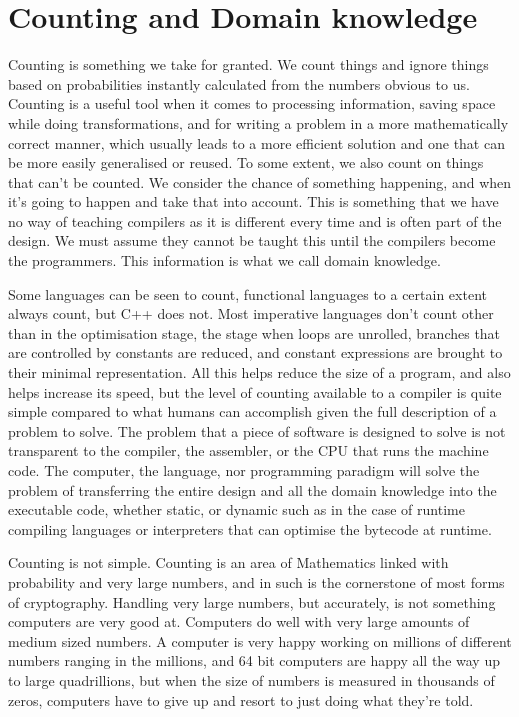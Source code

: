 \chapter{Counting and Domain knowledge}

Counting is something we take for granted. We count things and ignore things
based on probabilities instantly calculated from the numbers obvious to us.
Counting is a useful tool when it comes to processing information, saving space
while doing transformations, and for writing a problem in a more mathematically
correct manner, which usually leads to a more efficient solution and one that
can be more easily generalised or reused. To some extent, we also count on
things that can't be counted. We consider the chance of something happening,
and when it's going to happen and take that into account. This is something
that we have no way of teaching compilers as it is different every time and is
often part of the design. We must assume they cannot be taught this until the
compilers become the programmers. This information is what we call domain
knowledge.

Some languages can be seen to count, functional languages to a certain extent
always count, but C++ does not. Most imperative languages don't count other
than in the optimisation stage, the stage when loops are unrolled, branches
that are controlled by constants are reduced, and constant expressions are
brought to their minimal representation. All this helps reduce the size of a
program, and also helps increase its speed, but the level of counting available
to a compiler is quite simple compared to what humans can accomplish given the
full description of a problem to solve. The problem that a piece of software is
designed to solve is not transparent to the compiler, the assembler, or the CPU
that runs the machine code. The computer, the language, nor programming
paradigm will solve the problem of transferring the entire design and all the
domain knowledge into the executable code, whether static, or dynamic such as
in the case of runtime compiling languages or interpreters that can optimise
the bytecode at runtime.

Counting is not simple. Counting is an area of Mathematics linked with
probability and very large numbers, and in such is the cornerstone of most
forms of cryptography.  Handling very large numbers, but accurately, is not
something computers are very good at. Computers do well with very large amounts
of medium sized numbers. A computer is very happy working on millions of
different numbers ranging in the millions, and 64 bit computers are happy all
the way up to large quadrillions, but when the size of numbers is measured in
thousands of zeros, computers have to give up and resort to just doing what
they're told.

